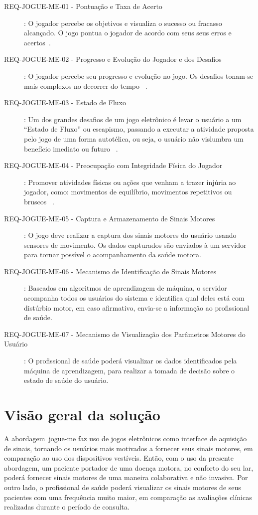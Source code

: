 \begin{description}
	\item[REQ-JOGUE-ME-01 - Pontuação e Taxa de Acerto]: O jogador percebe os objetivos e visualiza o sucesso ou fracasso alcançado. O jogo pontua o jogador de acordo com seus seus erros e acertos~\cite{Suhonen:2008:SFE:1457199.1457204,sinclair07}.
	\item[REQ-JOGUE-ME-02 - Progresso e Evolução do Jogador e dos Desafios]: O jogador percebe seu progresso e evolução no jogo. Os desafios tonam-se mais complexos no decorrer do tempo ~\cite{Suhonen:2008:SFE:1457199.1457204}.
	\item[REQ-JOGUE-ME-03 - Estado de Fluxo]: Um dos grandes desafios de um jogo eletrônico é levar o usuário a um ``Estado de Fluxo'' ou escapismo, passando a executar a atividade proposta pelo jogo de uma forma autotélica, ou seja, o usuário não vislumbra um benefício imediato ou futuro ~\cite{sweetser2005-gameflow}. 
	\item[REQ-JOGUE-ME-04 - Preocupação com Integridade Física do Jogador]: Promover atividades físicas ou ações que venham a trazer injúria ao jogador, como: movimentos de equilíbrio, movimentos repetitivos ou bruscos ~\cite{arntzen2011,sinclair07}.
	\item[REQ-JOGUE-ME-05 - Captura e Armazenamento de Sinais Motores]: O jogo deve realizar a captura dos sinais motores do usuário usando sensores de movimento. Os dados capturados são enviados à um servidor para tornar possível o acompanhamento da saúde motora.
	\item[REQ-JOGUE-ME-06 - Mecanismo de Identificação de Sinais Motores]: Baseados em algoritmos de aprendizagem de máquina, o servidor acompanha todos os usuários do sistema e identifica qual deles está com distúrbio motor, em caso afirmativo, envia-se a informação ao profissional de saúde.
	\item[REQ-JOGUE-ME-07 - Mecanismo de Visualização dos Parâmetros Motores do Usuário]: O profissional de saúde poderá visualizar os dados identificados pela máquina de aprendizagem, para realizar a tomada de decisão sobre o estado de saúde do usuário.
\end{description}

\section{Visão geral da solução}

A abordagem~\ac{jogue-me} faz uso de jogos eletrônicos como interface de aquisição de sinais, tornando os usuários mais motivados a fornecer seus sinais motores, em comparação ao uso dos dispositivos vestíveis. Então, com o uso da presente abordagem, um paciente portador de uma doença motora, no conforto do seu lar, poderá fornecer sinais motores de uma maneira colaborativa e não invasiva. Por outro lado, o profissional de saúde poderá visualizar os sinais motores de seus pacientes com uma frequência muito maior, em comparação as avaliações clínicas realizadas durante o período de consulta. 

